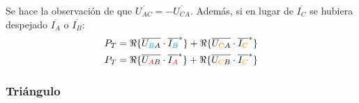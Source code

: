 	\begin{remark}
	    Se hace la observación de que $\overline{U_{AC}}=-\overline{U_{CA}}$. Además, si en lugar de $\overline{I_C}$ se hubiera despejado $\overline{I_A}$ o $\overline{I_B}$:
	    \begin{align*}
	        P_T&=\Re\{\overline{U_{\textcolor{cyan}{B}A}} \cdot \overline{I_{\textcolor{cyan}{B}}}^*\} + \Re\{\overline{U_{\textcolor{orange}{C}A}} \cdot \overline{I_{\textcolor{orange}{C}}}^*\}\\
	        P_T&=\Re\{\overline{U_{\textcolor{red}{A}B}} \cdot \overline{I_{\textcolor{red}{A}}}^*\} + \Re\{\overline{U_{\textcolor{orange}{C}B}} \cdot \overline{I_{\textcolor{orange}{C}}}^*\}
	    \end{align*}
	\end{remark}
	
	\subsubsection{Triángulo}
	
